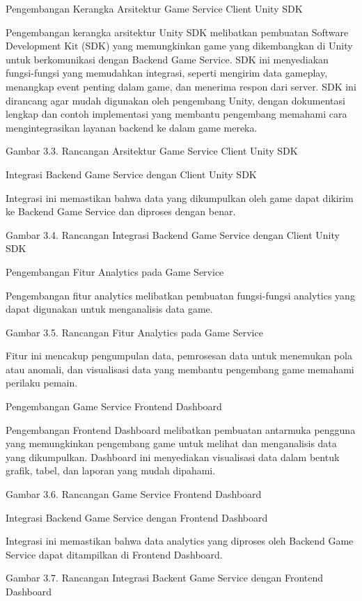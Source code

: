 Pengembangan Kerangka Arsitektur Game Service Client Unity SDK

Pengembangan kerangka arsitektur Unity SDK melibatkan pembuatan Software Development Kit (SDK) yang memungkinkan game yang dikembangkan di Unity untuk berkomunikasi dengan Backend Game Service. SDK ini menyediakan fungsi-fungsi yang memudahkan integrasi, seperti mengirim data gameplay, menangkap event penting dalam game, dan menerima respon dari server. SDK ini dirancang agar mudah digunakan oleh pengembang Unity, dengan dokumentasi lengkap dan contoh implementasi yang membantu pengembang memahami cara mengintegrasikan layanan backend ke dalam game mereka.

Gambar 3.3. Rancangan Arsitektur Game Service Client Unity SDK

Integrasi Backend Game Service dengan Client Unity SDK

Integrasi ini memastikan bahwa data yang dikumpulkan oleh game dapat dikirim ke Backend Game Service dan diproses dengan benar.

Gambar 3.4. Rancangan Integrasi Backend Game Service dengan Client Unity SDK

Pengembangan Fitur Analytics pada Game Service

Pengembangan fitur analytics melibatkan pembuatan fungsi-fungsi analytics yang dapat digunakan untuk menganalisis data game.

Gambar 3.5. Rancangan Fitur Analytics pada Game Service

Fitur ini mencakup pengumpulan data, pemrosesan data untuk menemukan pola atau anomali, dan visualisasi data yang membantu pengembang game memahami perilaku pemain.

Pengembangan Game Service Frontend Dashboard

Pengembangan Frontend Dashboard melibatkan pembuatan antarmuka pengguna yang memungkinkan pengembang game untuk melihat dan menganalisis data yang dikumpulkan. Dashboard ini menyediakan visualisasi data dalam bentuk grafik, tabel, dan laporan yang mudah dipahami.

Gambar 3.6. Rancangan Game Service Frontend Dashboard

Integrasi Backend Game Service dengan Frontend Dashboard

Integrasi ini memastikan bahwa data analytics yang diproses oleh Backend Game Service dapat ditampilkan di Frontend Dashboard.

Gambar 3.7. Rancangan Integrasi Backent Game Service dengan Frontend Dashboard

